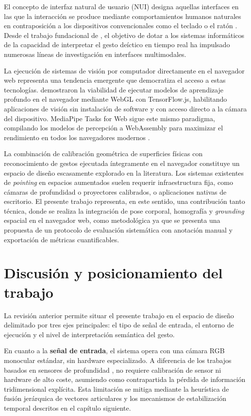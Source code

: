 \documentclass[12pt]{report} %
\begin{document}
El concepto de interfaz natural de usuario (NUI) designa aquellas interfaces en las que la interacción se produce mediante comportamientos humanos naturales en contraposición a los dispositivos convencionales como el teclado o el ratón \citep{dix2004hci}. Desde el trabajo fundacional de \citet{bolt1980put}, el objetivo de dotar a los sistemas informáticos de la capacidad de interpretar el gesto deíctico en tiempo real ha impulsado numerosas líneas de investigación en interfaces multimodales.

La ejecución de sistemas de visión por computador directamente en el navegador web representa una tendencia emergente que democratiza el acceso a estas tecnologías. \citet{smilkov2019tensorflow} demostraron la viabilidad de ejecutar modelos de aprendizaje profundo en el navegador mediante WebGL con TensorFlow.js, habilitando aplicaciones de visión sin instalación de software y con acceso directo a la cámara del dispositivo. MediaPipe Tasks for Web sigue este mismo paradigma, compilando los modelos de percepción a WebAssembly para maximizar el rendimiento en todos los navegadores modernos \citep{lugaresi2019mediapipe}.

La combinación de calibración geométrica de superficies físicas con reconocimiento de gestos ejecutada íntegramente en el navegador constituye un espacio de diseño escasamente explorado en la literatura. Los sistemas existentes de \textit{pointing} en espacios aumentados suelen requerir infraestructura fija, como cámaras de profundidad o proyectores calibrados, o aplicaciones nativas de escritorio. El presente trabajo representa, en este sentido, una contribución tanto técnica, donde se realiza la integración de pose corporal, homografía y \textit{grounding} espacial en el navegador web, como metodológica ya que se presenta una propuesta de un protocolo de evaluación sistemática con anotación manual y exportación de métricas cuantificables.

\section{Discusión y posicionamiento del trabajo}

La revisión anterior permite situar el presente trabajo en el espacio de diseño delimitado por tres ejes principales: el tipo de señal de entrada, el entorno de ejecución y el nivel de interpretación semántica del gesto.

En cuanto a la \textbf{señal de entrada}, el sistema opera con una cámara RGB monocular estándar, sin hardware especializado. A diferencia de los trabajos basados en sensores de profundidad \citep{nickel2003pointing, suarez2012hand}, no requiere calibración de sensor ni hardware de alto coste, asumiendo como contrapartida la pérdida de información tridimensional explícita. Esta limitación se mitiga mediante la heurística de fusión jerárquica de vectores articulares y los mecanismos de estabilización temporal descritos en el capítulo siguiente.
\end{document}

